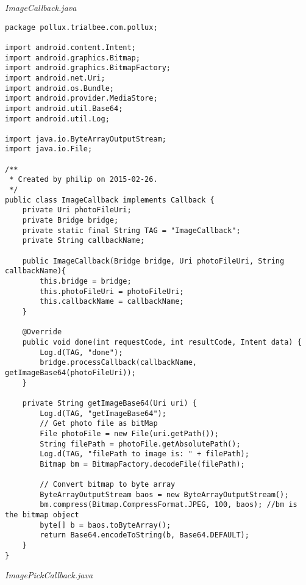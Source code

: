 \emph{ImageCallback.java}
\begin{lstlisting}
package pollux.trialbee.com.pollux;

import android.content.Intent;
import android.graphics.Bitmap;
import android.graphics.BitmapFactory;
import android.net.Uri;
import android.os.Bundle;
import android.provider.MediaStore;
import android.util.Base64;
import android.util.Log;

import java.io.ByteArrayOutputStream;
import java.io.File;

/**
 * Created by philip on 2015-02-26.
 */
public class ImageCallback implements Callback {
    private Uri photoFileUri;
    private Bridge bridge;
    private static final String TAG = "ImageCallback";
    private String callbackName;

    public ImageCallback(Bridge bridge, Uri photoFileUri, String callbackName){
        this.bridge = bridge;
        this.photoFileUri = photoFileUri;
        this.callbackName = callbackName;
    }

    @Override
    public void done(int requestCode, int resultCode, Intent data) {
        Log.d(TAG, "done");
        bridge.processCallback(callbackName, getImageBase64(photoFileUri));
    }

    private String getImageBase64(Uri uri) {
        Log.d(TAG, "getImageBase64");
        // Get photo file as bitMap
        File photoFile = new File(uri.getPath());
        String filePath = photoFile.getAbsolutePath();
        Log.d(TAG, "filePath to image is: " + filePath);
        Bitmap bm = BitmapFactory.decodeFile(filePath);

        // Convert bitmap to byte array
        ByteArrayOutputStream baos = new ByteArrayOutputStream();
        bm.compress(Bitmap.CompressFormat.JPEG, 100, baos); //bm is the bitmap object
        byte[] b = baos.toByteArray();
        return Base64.encodeToString(b, Base64.DEFAULT);
    }
}
\end{lstlisting}
\emph{ImagePickCallback.java}
